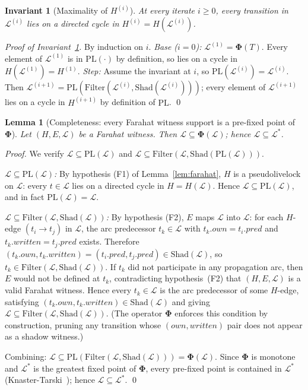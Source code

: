 \documentclass{article}
\newtheorem{lemma}[theorem]{Lemma}
\newtheorem{invariant}{Invariant}
\newcommand{\Ls}{\mathcal{L}^{*}}
\newcommand{\Li}[1]{\mathcal{L}^{(#1)}}   %
\newcommand{\Hi}[1]{H^{(#1)}}             %
\newcommand{\PL}{\mathrm{PL}}
\newcommand{\Shad}{\mathrm{Shad}}
\newcommand{\Filter}{\mathrm{Filter}}
\newcommand{\bPhi}{\boldsymbol{\Phi}}
\newcommand{\own}{\mathit{own}}
\newcommand{\writ}{\mathit{written}}
\newcommand{\pred}{\mathit{pred}}
\begin{document}
\begin{invariant}[Maximality of $\Hi{i}$]
\label{inv:max}
At every iterate $i\geq 0$, every transition in $\Li{i}$ lies on a
directed cycle in $\Hi{i}=H(\Li{i})$.
\end{invariant}

\begin{proof}[Proof of Invariant~\ref{inv:max}]
By induction on $i$.
\emph{Base ($i=0$):} $\Li{1}=\bPhi(T)$.
Every element of $\Li{1}$ is in $\PL(\cdot)$ by definition, so lies on
a cycle in $H(\Li{1})=\Hi{1}$.
\emph{Step:} Assume the invariant at $i$, so $\PL(\Li{i})=\Li{i}$.
Then $\Li{i+1}=\PL(\Filter(\Li{i},\Shad(\Li{i})))$; every element of
$\Li{i+1}$ lies on a cycle in $\Hi{i+1}$ by definition of $\PL$. \qed
\end{proof}

\begin{lemma}[Completeness: every Farahat witness support is a pre-fixed point of $\bPhi$]
\label{lem:prefixed}
Let $(H,E,\mathcal{L})$ be a Farahat witness.  Then
$\mathcal{L}\subseteq\bPhi(\mathcal{L})$; hence $\mathcal{L}\subseteq\Ls$.
\end{lemma}

\begin{proof}
We verify $\mathcal{L}\subseteq\PL(\mathcal{L})$ and
$\mathcal{L}\subseteq\Filter(\mathcal{L},\Shad(\PL(\mathcal{L})))$.

\emph{$\mathcal{L}\subseteq\PL(\mathcal{L})$:}
By hypothesis (F1) of Lemma~\ref{lem:farahat}, $H$ is a pseudolivelock
on $\mathcal{L}$: every $t\in\mathcal{L}$ lies on a directed cycle in
$H=H(\mathcal{L})$.  Hence $\mathcal{L}\subseteq\PL(\mathcal{L})$, and
in fact $\PL(\mathcal{L})=\mathcal{L}$.

\emph{$\mathcal{L}\subseteq\Filter(\mathcal{L},\Shad(\mathcal{L}))$:}
By hypothesis (F2), $E$ maps $\mathcal{L}$ into $\mathcal{L}$: for each
$H$-edge $(t_i\!\to\!t_j)$ in $\mathcal{L}$, the arc predecessor
$t_k\in\mathcal{L}$ with $t_k.\own=t_i.\pred$ and $t_k.\writ=t_j.\pred$
exists.  Therefore $(t_k.\own,t_k.\writ)=(t_i.\pred,t_j.\pred)\in\Shad(\mathcal{L})$,
so $t_k\in\Filter(\mathcal{L},\Shad(\mathcal{L}))$.  If $t_k$
did not participate in any propagation arc, then $E$ would not be
defined at $t_k$, contradicting hypothesis~(F2) that $(H,E,\mathcal{L})$
is a valid Farahat witness.  Hence every $t_k\in\mathcal{L}$ is the arc
predecessor of some $H$-edge, satisfying
$(t_k.\own,t_k.\writ)\in\Shad(\mathcal{L})$ and giving
$\mathcal{L}\subseteq\Filter(\mathcal{L},\Shad(\mathcal{L}))$.
(The operator $\bPhi$ enforces this condition by construction, pruning any
transition whose $(\own,\writ)$ pair does not appear as a shadow
witness.)

Combining: $\mathcal{L}\subseteq\PL(\Filter(\mathcal{L},\Shad(\mathcal{L})))
=\bPhi(\mathcal{L})$.  Since $\bPhi$ is monotone and $\Ls$ is the
greatest fixed point of $\bPhi$, every pre-fixed point is contained in
$\Ls$ (Knaster-Tarski~\citep{tarski1955}); hence $\mathcal{L}\subseteq\Ls$. \qed
\end{proof}
\end{document}
